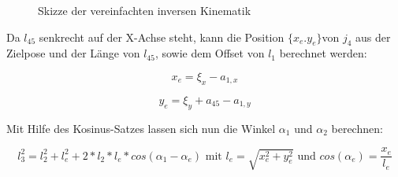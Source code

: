 \begin{figure}[h]
	\centering
	\hfill
	\hfill
	\label{fig:easyik}
	\caption{Skizze der vereinfachten inversen Kinematik}
\end{figure}


Da $l_{45}$ senkrecht auf der X-Achse steht, kann die Position $\{x_{e}. y_{e}\}$von $j_4$ aus der Zielpose und der Länge von $l_45$, sowie dem Offset von $l_ {1}$ berechnet werden:

\begin{equation}
x_{e} = \xi_{x} - a_{1,x}
\label{eq:9}
\end{equation}

\begin{equation}
y_{e} = \xi_{y} + a_{45} - a_{1,y}
\label{eq:10}
\end{equation}

Mit Hilfe des Kosinus-Satzes lassen sich nun die Winkel $\alpha_1$ und $\alpha_2$ berechnen:

\begin{equation}
l_3^2 = l_2^2 + l_{e}^2 + 2 * l_2 * l_{e} * cos(\alpha_1 - \alpha_{e}) \text{ mit } l_{e} = \sqrt{x_{e}^2 + y_{e}^2} \text{ und } cos(\alpha_e) = \dfrac{x_{e}}{l_{e}}
\label{eq:11}
\end{equation}


